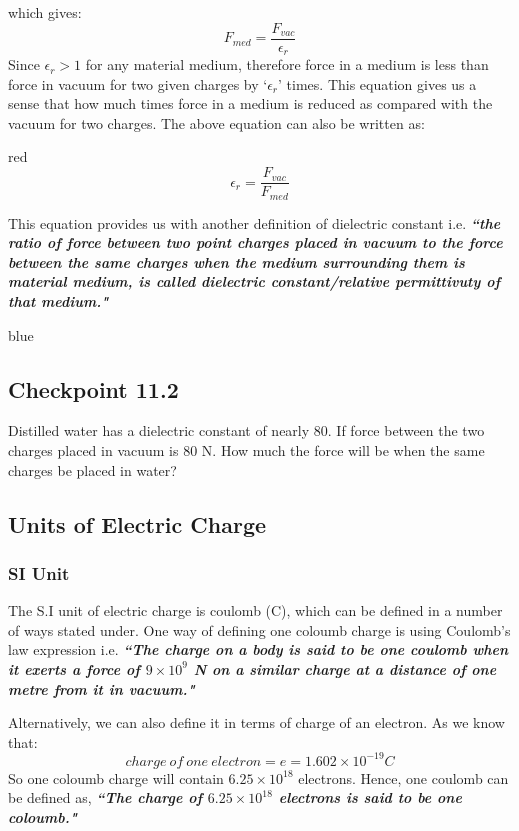 which gives:
\begin{equation}\label{eq:11.11}
  F_{med} = \frac{F_{vac}}{\epsilon_{r}}
\end{equation}
Since $\epsilon_{r} > 1$ for any material medium, therefore force in a medium
is less than force in vacuum for two given charges by `$\epsilon_{r}$' times.
This equation gives us a sense that how much times force in a medium is reduced as compared with the vacuum for two charges.
The above equation can also be written as:
\begin{mybox}{red}{}
\begin{equation}\label{eq:11.12}
  \epsilon_{r} = \frac{F_{vac}}{F_{med}}
\end{equation}
\end{mybox}
This equation provides us with another definition of dielectric constant
i.e. \textit{\textbf{``the ratio of force between two point charges placed in vacuum
to the force between the same charges when the medium surrounding
them is material medium,
is called dielectric constant/relative permittivuty of that medium."}}
\begin{mybox}{blue}{}
  \subsection*{\checkpoint{} Checkpoint 11.2}
  Distilled water has a dielectric constant of nearly 80.
  If force between the two charges placed in vacuum is 80 N.
  How much the force will be when the same charges be placed in water?
\end{mybox}
\subsection{Units of Electric Charge}
\subsubsection{SI Unit}
The S.I unit of electric charge is coulomb (C), which can be defined in a
number of ways stated under.
One way of defining one coloumb charge is using Coulomb’s law
expression i.e. \textit{\textbf{``The charge on a body is said to be one coulomb when it exerts
a force of $9\times 10^{9}$ N on a similar charge at a distance
of one metre from it in vacuum."}}

Alternatively, we can also define it in terms of charge of an electron.
As we know that:
\begin{equation}
  charge\:of\:one\:electron = e = 1.602\times 10^{-19} C \nonumber
\end{equation}
So one coloumb charge will contain $6.25\times 10^{18}$ electrons.
Hence, one coulomb can be defined as, 
\textit{\textbf{``The charge of $6.25\times 10^{18}$ electrons
is said to be one coloumb."}}

